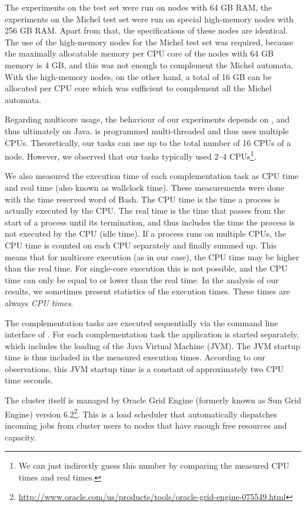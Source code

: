 The experiments on the \goal{} test set were run on nodes with 64 GB RAM, the experiments on the Michel test set were run on special high-memory nodes with 256 GB RAM. Apart from that, the specifications of these nodes are identical. The use of the high-memory nodes for the Michel test set was required, because the maximally allocatable memory per CPU core of the nodes with 64 GB memory is 4 GB, and this was not enough to complement the Michel automata. With the high-memory nodes, on the other hand, a total of 16 GB can be allocated per CPU core which was sufficient to complement all the Michel automata.

Regarding multicore usage, the behaviour of our experiments depends on \goal, and thus ultimately on Java. \goal{} is programmed multi-threaded and thus uses multiple CPUs. Theoretically, our tasks can use up to the total number of 16 CPUs of a node. However, we observed that our tasks typically used 2--4 CPUs\footnote{We can just indirectly guess this number by comparing the measured CPU times and real times.}.

We also measured the execution time of each complementation task as CPU time and real time (also known as wallclock time). These measurements were done with the \textsf{time} reserved word of Bash. The CPU time is the time a process is actually executed by the CPU. The real time is the time that passes from the start of a process until its termination, and thus includes the time the process is not executed by the CPU (idle time). If a process runs on multiple CPUs, the CPU time is counted on each CPU separately and finally summed up. This means that for multicore execution (as in our case), the CPU time may be higher than the real time. For single-core execution this is not possible, and the CPU time can only be equal to or lower than the real time. In the analysis of our results, we sometimes present statistics of the execution times. These times are always \textit{CPU times}.

The complementation tasks are executed sequentially via the command line interface of \goal. For each complementation task the \goal{} application is started separately, which includes the loading of the Java Virtual Machine (JVM). The JVM startup time is thus included  in the measured execution times. According to our observations, this JVM startup time is a constant of approximately two CPU time seconds.

The cluster itself is managed by Oracle Grid Engine (formerly known as Sun Grid Engine) version 6.2\footnote{\url{http://www.oracle.com/us/products/tools/oracle-grid-engine-075549.html}}. This is a load scheduler that automatically dispatches incoming jobs from cluster users to nodes that have enough free resources and capacity.

